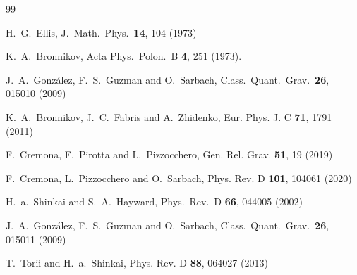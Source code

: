 \documentclass[aps,prl,reprint,superscriptaddress,nofootinbib,floatfix]{revtex4-2}
\begin{document}
\begin{thebibliography}{99}

  H.~G.~Ellis,
  J.\ Math.\ Phys.\  {\bf 14}, 104 (1973)

  K.~A.~Bronnikov,
  Acta Phys.\ Polon.\ B {\bf 4}, 251 (1973).

  J.~A.~Gonz\'alez, F.~S.~Guzman and O.~Sarbach,
  Class.\ Quant.\ Grav.\  {\bf 26}, 015010 (2009)

K.~A.~Bronnikov, J.~C.~Fabris and A.~Zhidenko,
Eur. Phys. J. C \textbf{71}, 1791 (2011)

F.~Cremona, F.~Pirotta and L.~Pizzocchero,
Gen. Rel. Grav. \textbf{51}, 19 (2019)

F.~Cremona, L.~Pizzocchero and O.~Sarbach,
Phys. Rev. D \textbf{101}, 104061 (2020)

  H.~a.~Shinkai and S.~A.~Hayward,
  Phys.\ Rev.\ D {\bf 66}, 044005 (2002)

  J.~A.~Gonz\'alez, F.~S.~Guzman and O.~Sarbach,
  Class.\ Quant.\ Grav.\  {\bf 26},  015011 (2009)

T.~Torii and H.~a.~Shinkai,
Phys. Rev. D \textbf{88}, 064027 (2013)


\end{thebibliography}
\end{document}
